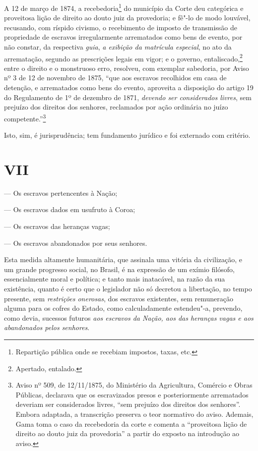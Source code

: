 A 12 de março de 1874, a recebedoria\footnote{Repartição pública onde
  se recebiam impostos, taxas, etc.} do município da Corte deu
categórica e proveitosa lição de direito ao douto juiz da provedoria; e
fê"-lo de modo louvável, recusando, com ríspido civismo, o recebimento de
imposto de transmissão de propriedade de escravos irregularmente
arrematados como bens de evento, por não constar, da respectiva
\emph{guia}, \emph{a exibição da matrícula especial}, no ato da
arrematação, segundo as prescrições legais em vigor; e o governo,
entaliscado,\footnote{Apertado, entalado.} entre o direito e o
monstruoso erro, resolveu, com exemplar sabedoria, por Aviso nº 3 de 12
de novembro de 1875, ``que aos escravos recolhidos em casa de detenção, e
arrematados como bens do evento, aproveita a disposição do artigo 19 do
Regulamento de 1º de dezembro de 1871, \emph{devendo ser considerados
livres}, sem prejuízo dos direitos dos senhores, reclamados por ação
ordinária no juízo competente.''\footnote{Aviso nº 509, de 12/11/1875,
  do Ministério da Agricultura, Comércio e Obras Públicas, declarava que
  os escravizados presos e posteriormente arrematados deveriam ser
  considerados livres, ``sem prejuízo dos direitos dos senhores''. Embora
  adaptada, a transcrição preserva o teor normativo do aviso. Ademais,
  Gama toma o caso da recebedoria da corte e comenta a ``proveitosa lição
  de direito ao douto juiz da provedoria'' a partir do exposto na
  introdução ao aviso.}

Isto, sim, é jurisprudência; tem fundamento jurídico e foi externado com
critério.

\section*{VII}


--- Os escravos pertencentes à Nação;

--- Os escravos dados em usufruto à Coroa;

--- Os escravos das heranças vagas;

--- Os escravos abandonados por seus senhores.

Esta medida altamente humanitária, que assinala uma vitória da
civilização, e um grande progresso social, no Brasil, é na expressão de
um exímio filósofo, essencialmente moral e política; e tanto mais
inatacável, na razão da sua existência, quanto é certo que o legislador
não só decretou a libertação, no tempo presente, sem \emph{restrições
onerosas}, dos escravos existentes, sem remuneração alguma para os
cofres do Estado, como calculadamente estendeu"-a, prevendo, como devia,
sucessos futuros \emph{aos escravos da Nação, aos das heranças vagas e
aos abandonados pelos senhores}.

